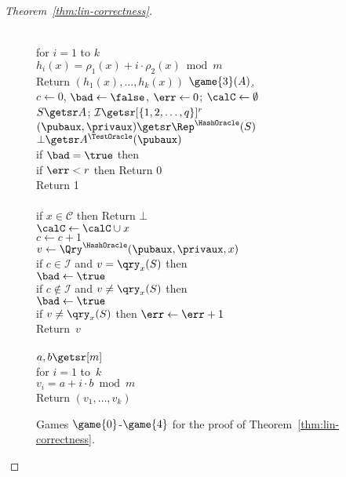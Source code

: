 \begin{proof}[Theorem~\ref{thm:lin-correctness}]
\begin{figure}[tp]
{{\medskip
{}\\
for $i=1$ to $k$\\
\nudge $h_i(x) = \rho_1(x) + i \cdot \rho_2(x) \bmod m$\\
Return $\left(h_1(x),\ldots,h_k(x)\right)$
}
{
\underline{{$\game{3}(A)$},}\\
$c\gets 0$, $\bad \gets \false$, $\err \gets 0$;  $\calC \gets \emptyset$\\
$S \getsr A$; $\mathcal{I}\getsr [\{1,2,\ldots,q\}]^r$\\
$(\pubaux,\privaux) \getsr \Rep^{\HashOracle}(S)$\\
$\bot \getsr A^{\TestOracle}(\pubaux)$\\
if $\bad = \true$ then \\
if $\err  < r$ then Return 0\\
Return 1\\

\medskip
{}\\
if $x \in \mathcal{C}$ then Return $\bot$\\
$\calC \gets \calC \cup x$\\
$c \gets c+1$\\
$v \gets \Qry^{\HashOracle}(\pubaux,\privaux, x)$\\
if $c \in \mathcal{I}$ and $v = \qry_x(S)$ then \\
\nudge $\bad \gets \true$ \\
if $c \not\in \mathcal{I}$ and $v \neq \qry_x(S)$ then \\
\nudge $\bad \gets \true$\\
if $v \neq \qry_x(S)$ then $\err \gets \err +1$\\
Return~$v$\\

\medskip
{}\\
$a,b \getsr [m]$\\
for $i = 1$ to~$k$\\
\nudge $v_i = a+i \cdot b \bmod m$\\
Return $\left(v_1,\ldots,v_k\right)$
}
}
\caption{Games $\game{0}$-$\game{4}$ for the
proof of Theorem~\ref{thm:lin-correctness}.}
\label{fig:lin-correctness-games}
\end{figure}



\end{proof}

